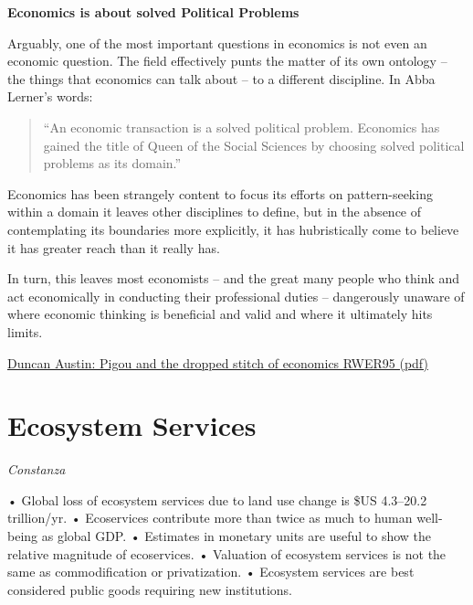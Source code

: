 \documentclass[
]{book}
\begin{document}
\textbf{Economics is about solved Political Problems}

Arguably, one of the most important questions in economics is not even an economic
question.
The field effectively punts the matter of its own ontology -- the things that economics
can talk about -- to a different discipline. In Abba Lerner's words:

\begin{quote}
``An economic transaction is a solved political problem. Economics has
gained the title of Queen of the Social Sciences by choosing solved political
problems as its domain.''
\end{quote}

Economics has been strangely content to focus its efforts on pattern-seeking within a domain
it leaves other disciplines to define, but in the absence of contemplating its boundaries more
explicitly, it has hubristically come to believe it has greater reach than it really has.

In turn, this leaves most economists -- and the great many people who think and act
economically in conducting their professional duties -- dangerously unaware of where
economic thinking is beneficial and valid and where it ultimately hits limits.

\href{pdf/Austin_2021_Pigou_and_the_dropped_stitch_of_economics_RWER95.pdf}{Duncan Austin: Pigou and the dropped stitch of economics RWER95 (pdf)}

\hypertarget{ecosystem-services}{%
\section{Ecosystem Services}\label{ecosystem-services}}

\emph{Constanza}

• Global loss of ecosystem services due to land use change is \$US 4.3--20.2 trillion/yr.
• Ecoservices contribute more than twice as much to human well-being as global GDP.
• Estimates in monetary units are useful to show the relative magnitude of ecoservices.
• Valuation of ecosystem services is not the same as commodification or privatization.
• Ecosystem services are best considered public goods requiring new institutions.
\end{document}
